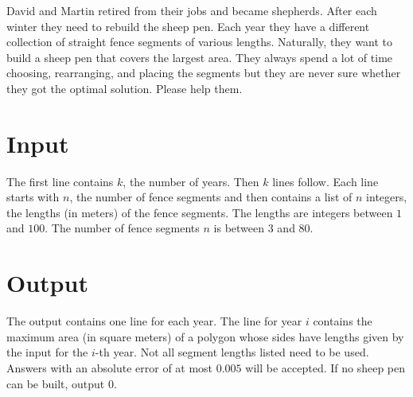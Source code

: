 
David and Martin retired from their jobs and became shepherds. After
each winter they need to rebuild the sheep pen. Each year they have a
different collection of straight fence segments of various
lengths. Naturally, they want to build a sheep pen that covers the
largest area. They always spend a lot of time choosing, rearranging,
and placing the segments but they are never sure whether they got the
optimal solution. Please help them.

\section*{Input}

The first line contains $k$, the number of years. Then $k$ lines
follow. Each line starts with $n$, the number of fence segments and then
contains a list of $n$ integers, the lengths (in meters) of the fence
segments. The lengths are integers between $1$ and $100$. The number of
fence segments $n$ is between $3$ and $80$.

\section*{Output}

The output contains one line for each year. The line for year $i$
contains the maximum area (in square meters) of a polygon whose sides
have lengths given by the input for the $i$-th year.  Not all segment
lengths listed need to be used. Answers with an absolute error of at most
$0.005$ will be accepted. If no sheep pen can be built, output $0$.
